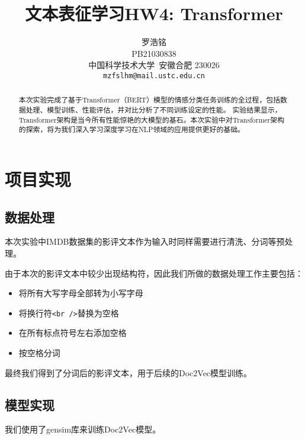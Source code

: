 \documentclass{article}
\title{文本表征学习HW4: Transformer}
\author{
  罗浩铭 \\
  PB21030838\\
  中国科学技术大学\ 安徽合肥 230026 \\
  \texttt{mzfslhm@mail.ustc.edu.cn} \\
}
\begin{document}
\maketitle


\begin{abstract}
  本次实验完成了基于Transformer（BERT）模型的情感分类任务训练的全过程，包括数据处理、模型训练、性能评估，并对比分析了不同训练设定的性能。
  实验结果显示，
  Transformer架构是当今所有性能惊艳的大模型的基石。本次实验中对Transformer架构的探索，将为我们深入学习深度学习在NLP领域的应用提供更好的基础。
\end{abstract}





\section{项目实现}
\subsection{数据处理}
本次实验中IMDB数据集的影评文本作为输入时同样需要进行清洗、分词等预处理。

由于本次的影评文本中较少出现结构符，因此我们所做的数据处理工作主要包括：
\begin{itemize}
  \item 将所有大写字母全部转为小写字母
  \item 将换行符\verb|<br />|替换为空格
  \item 在所有标点符号左右添加空格
  \item 按空格分词
\end{itemize}

最终我们得到了分词后的影评文本，用于后续的Doc2Vec模型训练。


\subsection{模型实现}
我们使用了gensim库来训练Doc2Vec模型。
\end{document}
